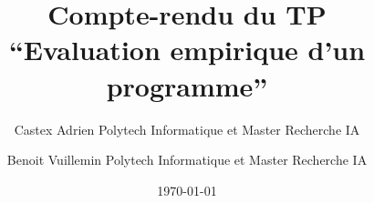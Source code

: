 \documentclass[a4paper,11pt]{article}
\let\urlorig\url
\renewcommand{\url}[1] {%
	\begin{otherlanguage}{english}\urlorig{#1}\end{otherlanguage}%
}
\begin{document}
\title{Compte-rendu du TP \\``Evaluation empirique d'un programme''}
\author{Castex Adrien Polytech Informatique et Master Recherche IA \and Benoit Vuillemin Polytech Informatique et Master Recherche IA}
\date{\today}
\maketitle

\tableofcontents
\newpage








\end{document}
